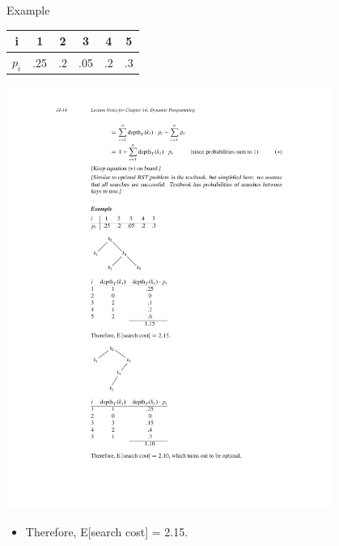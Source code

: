 \documentclass[aspectratio=169]{beamer}
\begin{document}
\begin{frame}{Example}
    \centering
    \begin{tabular}{c | c c c c c}
        i & 1 & 2 & 3 & 4 & 5 \\
        \hline
        $p_i$ & .25 & .2 & .05 & .2 & .3
    \end{tabular}
    \includegraphics[width=0.8\textwidth, trim={4cm 12cm 4cm 9.75cm}, clip]{figures/BST_example}
    \begin{itemize}
        \item Therefore, E[search cost] = 2.15.
    \end{itemize}
\end{frame}
\end{document}
